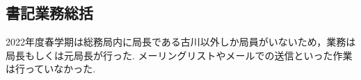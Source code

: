 \subsection*{書記業務総括}


2022年度春学期は総務局内に局長である古川以外しか局員がいないため，業務は局長もしくは元局長が行った. メーリングリストやメールでの送信といった作業は行っていなかった.
